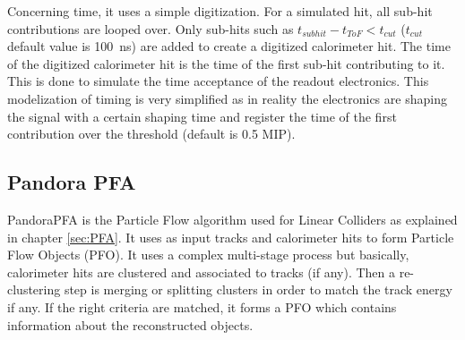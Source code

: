 Concerning time, it uses a simple digitization. For a simulated hit, all sub-hit contributions are looped over. Only sub-hits such as $t_{subhit} - t_{ToF} < t_{cut}$ ($t_{cut}$ default value is \SI{100}{\ns}) are added to create a digitized calorimeter hit. The time of the digitized calorimeter hit is the time of the first sub-hit contributing to it. This is done to simulate the time acceptance of the readout electronics. This modelization of timing is very simplified as in reality the electronics are shaping the signal with a certain shaping time and register the time of the first contribution over the threshold (default is 0.5 MIP).

\subsection{Pandora PFA}

PandoraPFA \cite{Thomson:2009rp} is the Particle Flow algorithm used for Linear Colliders as explained in chapter \ref{sec:PFA}. It uses as input tracks and calorimeter hits to form Particle Flow Objects (PFO). It uses a complex multi-stage process but basically, calorimeter hits are clustered and associated to tracks (if any). Then a re-clustering step is merging or splitting clusters in order to match the track energy if any. If the right criteria are matched, it forms a PFO which contains information about the reconstructed objects.
